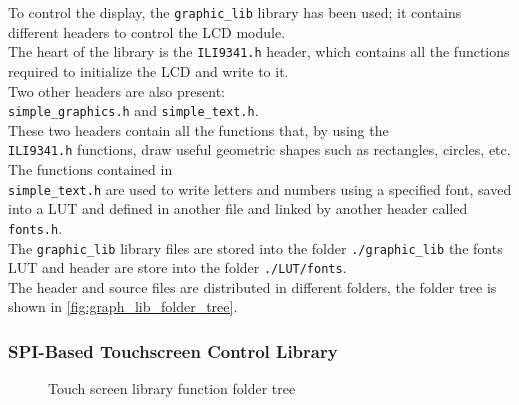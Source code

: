 \noindent
To control the display, the \texttt{graphic\_lib} library has been used; it contains different headers to control the LCD module. \\
The heart of the library is the \texttt{ILI9341.h} header, which contains all the functions required to initialize the LCD and write to it. \\
Two other headers are also present: \\
\texttt{simple\_graphics.h} and \texttt{simple\_text.h}. \\
These two headers contain all the functions that, by using the \\
\texttt{ILI9341.h} functions, draw useful geometric shapes such as rectangles, circles, etc. \\
The functions contained in \\
\texttt{simple\_text.h} are used to write letters and numbers using a specified font, saved into a LUT and defined in another file and linked by another header called \texttt{fonts.h}. \\
The \texttt{graphic\_lib} library files are stored into the folder \texttt{./graphic\_lib} the fonts LUT and header are store into the folder \texttt{./LUT/fonts}. \\
The header and source files are distributed in different folders, the folder tree is shown in \autoref{fig:graph_lib_folder_tree}.

\newpage
\subsubsection{SPI-Based Touchscreen Control Library}


\begin{figure}[h!]
    \begin{center}
    \end{center}

    \caption{Touch screen library function folder tree}
    \label{fig:touch_lib_folder_tree}
    
\end{figure}

